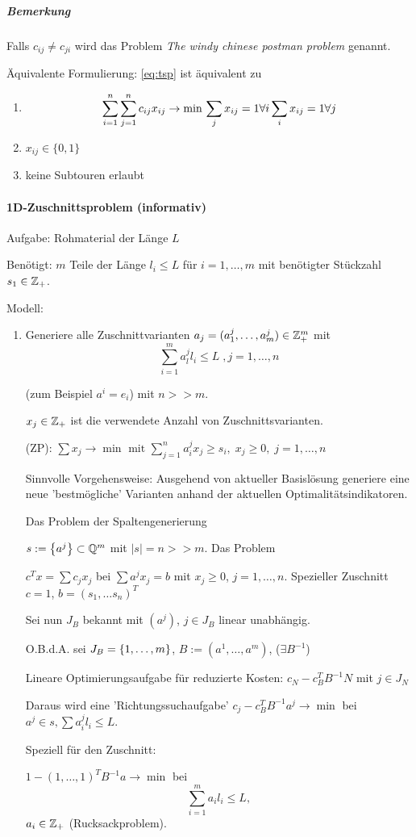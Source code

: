 \subparagraph{Bemerkung} Falls $c_{ij} \neq c_{ji}$ wird das Problem \emph{The windy chinese postman problem} genannt. 


Äquivalente Formulierung: \eqref{eq:tsp} ist äquivalent zu 
\begin{enumerate}
\item  $$
\sum_{i= 1}^n \sum_{j= 1}^n c_{ij} x_{ij} \rightarrow \min \\
\sum_j x_{ij} = 1 \forall i\\
\sum_i x_{ij} = 1 \forall j
$$
\item $x_{ij} \in \{0,1\}$
\item keine Subtouren erlaubt
\end{enumerate}

\paragraph{1D-Zuschnittsproblem (informativ)}

Aufgabe: Rohmaterial der Länge $L$

Benötigt: $m$ Teile der Länge $l_i \leq L$ für $i = 1, \dots, m$ mit benötigter Stückzahl $s_1 \in \mathbb{Z}_+$.

Modell:
\begin{enumerate}
\item Generiere alle Zuschnittvarianten $a_j = (a_1^j, \dots, a_m^j) \in \mathbb{Z}_+^m$ mit $$\sum_{i = 1}^m a_l^j l_i \leq L \; , j = 1, \dots, n$$

(zum Beispiel $a^i = e_i$) mit $n>>m$.

$x_j \in \mathbb{Z}_+$ ist die verwendete Anzahl von Zuschnittsvarianten.


(ZP):
$
\sum x_j \rightarrow \min \text{ mit } \sum_{j = 1}^n a_i^j x_j \geq s_i, \; x_j \geq 0, \; j = 1, \dots, n
$

Sinnvolle Vorgehensweise: Ausgehend von aktueller Basislösung generiere eine neue 'bestmögliche' Varianten anhand der aktuellen Optimalitätsindikatoren. 

Das Problem der Spaltengenerierung

$s := \set{a^j} \subset \rats^m$ mit $|s| = n>>m$. Das Problem 

$ c^Tx = \sum c_jx_j$ bei $\sum a^j x_j = b$ mit $x_j \geq 0$, $j = 1, \dots, n$.
Spezieller Zuschnitt $c = 1$, $b = (s_1, \dots s_n)^T$

Sei nun $J_B$ bekannt mit $(a^j)$, $j \in J_B$ linear unabhängig.

O.B.d.A. sei $J_B = \set{1, \dots, m}$, $B := (a^1, \dots, a^m)$, ($\exists B^{-1}$)

Lineare Optimierungsaufgabe für reduzierte Kosten: $c_N - c_B^T B^{-1}N$ mit $j \in J_N$

Daraus wird eine 'Richtungssuchaufgabe' $c_j -c_B^TB^{-1}a^j \rightarrow \min$ bei $a^j \in s, \sum a_i^j l_i \leq L$.

Speziell für den Zuschnitt:

$1-(1, \dots, 1)^T B^{-1}a \rightarrow \min$ bei $$\sum_{i = 1}^ma_il_i \leq L,$$ $a_i \in \mathbb{Z}_+$ (Rucksackproblem).
\end{enumerate}
